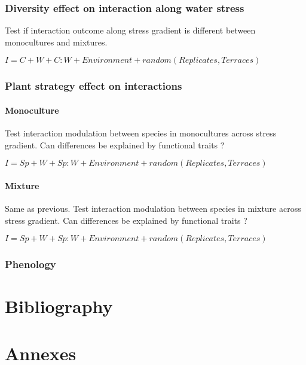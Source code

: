 \documentclass[12pt, a4paper]{article} %
\begin{document}
\subsubsection{Diversity effect on interaction along water stress}
Test if interaction outcome along stress gradient is different between monocultures and mixtures.

$I= C + W + C:W + Environment + random(Replicates,Terraces)$

\subsubsection{Plant strategy effect on interactions}

\paragraph{Monoculture}
Test interaction modulation between species in monocultures across stress gradient. Can differences be explained by functional traits ?

$I= Sp + W + Sp:W + Environment + random(Replicates,Terraces)$

\paragraph{Mixture}
Same as previous. Test interaction modulation between species in mixture across stress gradient. Can differences be explained by functional traits ?

$I= Sp + W + Sp:W + Environment + random(Replicates,Terraces)$

\subsubsection{Phenology}

\section{Bibliography}



\begin{spacing}{1.0}

\end{spacing}

\section{Annexes}
\end{document}
